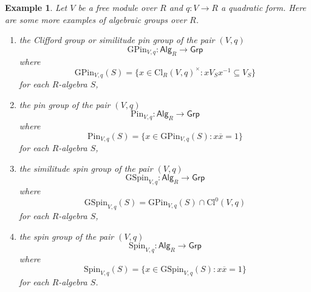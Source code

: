 \documentclass[10pt]{book}
\theoremstyle{bookplain}
\theoremstyle{bookdefinition}
\newtheorem{example}[theorem]{Example}
\theoremstyle{bookremark}
\begin{document}
\begin{example}Let $V$ be a free module over $R$ and $q:V\rightarrow R$ a quadratic form. Here are some more examples of algebraic groups over $R$. 
    \begin{enumerate}
        \item the \textit{Clifford group} or \textit{similitude pin group} of the pair $(V,q)$
        \[\mathrm{GPin}_{V,q}:\mathsf{Alg}_R\rightarrow\mathsf{Grp}\]
        where 
        \[\mathrm{GPin}_{V,q}(S)=\{x\in \mathrm{Cl}_R(V,q)^\times:xV_Sx^{-1}\subseteq V_S\}\]
        for each $R$-algebra $S$,
        \item the \textit{pin group} of the pair $(V,q)$
        \[\mathrm{Pin}_{V,q}:\mathsf{Alg}_R\rightarrow\mathsf{Grp}\]
        where 
        \[\mathrm{Pin}_{V,q}(S)=\{x\in\mathrm{GPin}_{V,q}(S):x\overline{x}=1\}\]
        for each $R$-algebra $S$,

        \item the \textit{similitude spin group} of the pair $(V,q)$
        \[\mathrm{GSpin}_{V,q}:\mathsf{Alg}_R\rightarrow\mathsf{Grp}\]
        where 
        \[\mathrm{GSpin}_{V,q}(S)=\mathrm{GPin}_{V,q}(S)\cap \mathrm{Cl}^0(V,q)\]
        for each $R$-algebra $S$,

        \item the \textit{spin group} of the pair $(V,q)$
        \[\mathrm{Spin}_{V,q}:\mathsf{Alg}_R\rightarrow\mathsf{Grp}\]
        where 
        \[\mathrm{Spin}_{V,q}(S)=\{x\in \mathrm{GSpin}_{V,q}(S):x\overline{x}=1\}\]
        for each $R$-algebra $S$.
        
    \end{enumerate}
\end{example}
\end{document}
